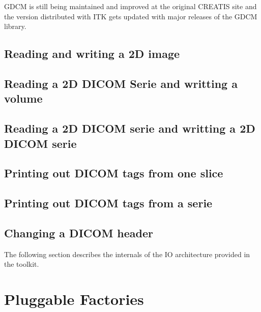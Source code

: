 GDCM is still being maintained and improved at the original CREATIS site and
the version distributed with ITK gets updated with major releases of the GDCM
library.

\subsection{Reading and writing a 2D image}
\label{DicomImageReadWrite}


\subsection{Reading a 2D DICOM Serie and writting a volume}
\label{DicomSeriesReadImageWrite2}


\subsection{Reading a 2D DICOM serie and writting a 2D DICOM serie}
\label{DicomSeriesReadSeriesWrite}


\subsection{Printing out DICOM tags from one slice}
\label{DicomSeriesReadPrintTags}


\subsection{Printing out DICOM tags from a serie}
\label{DicomImageReadPrintTags}


\subsection{Changing a DICOM header}
\label{DicomImageReadChangeHeaderWrite}




The following section describes the internals of the IO architecture provided
in the toolkit.

\section{Pluggable Factories}
\label{sec:ImageIOPluggableFactories}

